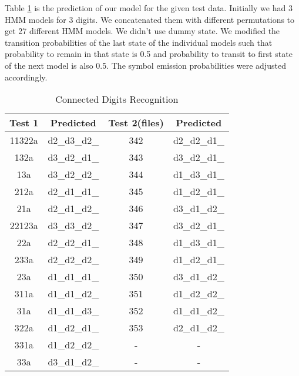 Table \ref{table:2} is the prediction of our model for the given test data. Initially we had 3 HMM models for 3 digits. We concatenated them with different permutations to get 27 different HMM models. We didn't use dummy state. We modified the transition probabilities of the last state of the individual models such that probability to remain in that state is 0.5 and probability to transit to first state of the next model is also 0.5. The symbol emission probabilities were adjusted accordingly.
\begin{table}[h!]
\centering

\begin{tabular}{|c|c||c|c|}\hline
\textbf{Test 1} & \textbf{Predicted} & \textbf{Test 2(files)} & \textbf{Predicted} \\\hline\hline
11322a            & d2\_d3\_d2\_       & 342 & d2\_d2\_d1\_  \\\hline
132a              & d3\_d2\_d1\_       & 343 & d3\_d2\_d1\_  \\\hline
13a               & d3\_d2\_d2\_       & 344 & d1\_d3\_d1\_  \\\hline
212a              & d2\_d1\_d1\_       & 345 & d1\_d2\_d1\_  \\\hline
21a               & d2\_d1\_d2\_       & 346 & d3\_d1\_d2\_   \\\hline
22123a            & d3\_d3\_d2\_       & 347 & d3\_d2\_d1\_  \\\hline
22a               & d2\_d2\_d1\_       & 348 & d1\_d3\_d1\_  \\\hline
233a              & d2\_d2\_d2\_       & 349 & d1\_d2\_d1\_  \\\hline
23a               & d1\_d1\_d1\_       & 350 & d3\_d1\_d2\_  \\\hline
311a              & d1\_d1\_d2\_       & 351 & d1\_d2\_d2\_  \\\hline
31a               & d1\_d1\_d3\_       & 352 & d1\_d1\_d2\_  \\\hline
322a              & d1\_d2\_d1\_       & 353 & d2\_d1\_d2\_  \\\hline
331a              & d1\_d2\_d2\_       & - & -  \\\hline
33a               & d3\_d1\_d2\_       & - & -  \\\hline
\end{tabular}
\caption{Connected Digits Recognition}
\label{table:2}
\end{table}

